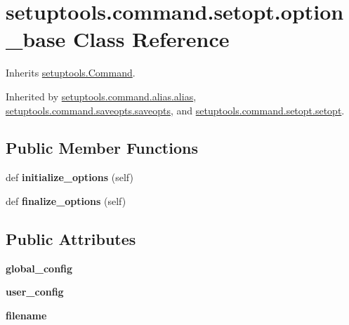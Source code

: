 \hypertarget{classsetuptools_1_1command_1_1setopt_1_1option__base}{}\section{setuptools.\+command.\+setopt.\+option\+\_\+base Class Reference}
\label{classsetuptools_1_1command_1_1setopt_1_1option__base}


Inherits \hyperlink{classsetuptools_1_1_command}{setuptools.\+Command}.



Inherited by \hyperlink{classsetuptools_1_1command_1_1alias_1_1alias}{setuptools.\+command.\+alias.\+alias}, \hyperlink{classsetuptools_1_1command_1_1saveopts_1_1saveopts}{setuptools.\+command.\+saveopts.\+saveopts}, and \hyperlink{classsetuptools_1_1command_1_1setopt_1_1setopt}{setuptools.\+command.\+setopt.\+setopt}.

\subsection*{Public Member Functions}
\begin{DoxyCompactItemize}
\item 
\mbox{\label{classsetuptools_1_1command_1_1setopt_1_1option__base_a6a84366f824dca28ccda2b6c4dfa13fd}} 
def {\bfseries initialize\+\_\+options} (self)
\item 
\mbox{\label{classsetuptools_1_1command_1_1setopt_1_1option__base_a20bf2d2ef02bd4b89cfdee7dd3be8805}} 
def {\bfseries finalize\+\_\+options} (self)
\end{DoxyCompactItemize}
\subsection*{Public Attributes}
\begin{DoxyCompactItemize}
\item 
\mbox{\label{classsetuptools_1_1command_1_1setopt_1_1option__base_a84a54e15422a6d7d41046ea769a7b061}} 
{\bfseries global\+\_\+config}
\item 
\mbox{\label{classsetuptools_1_1command_1_1setopt_1_1option__base_abf3e8d8871be902ab84f02921b83b0e1}} 
{\bfseries user\+\_\+config}
\item 
\mbox{\label{classsetuptools_1_1command_1_1setopt_1_1option__base_aa51e1c6a8c29785f328ecc8abafb7895}} 
{\bfseries filename}
\end{DoxyCompactItemize}
